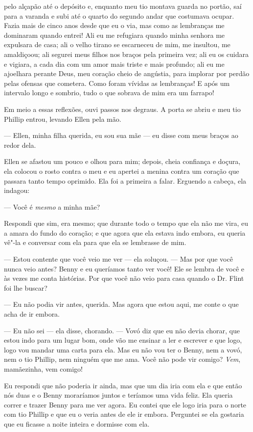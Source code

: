 pelo alçapão até o depósito e, enquanto meu tio montava guarda no
portão, saí para a varanda e subi até o quarto do segundo andar que
costumava ocupar. Fazia mais de cinco anos desde que eu o via, mas como
as lembranças me dominaram quando entrei! Ali eu me refugiara quando
minha senhora me expulsara de casa; ali o velho tirano se escarneceu de
mim, me insultou, me amaldiçoou; ali segurei meus filhos nos braços pela
primeira vez; ali eu os cuidara e vigiara, a cada dia com um amor mais
triste e mais profundo; ali eu me ajoelhara perante Deus, meu coração
cheio de angústia, para implorar por perdão pelas ofensas que cometera.
Como foram vívidas as lembranças! E após um intervalo longo e sombrio,
tudo o que sobrava de mim era um farrapo!

Em meio a essas reflexões, ouvi passos
nos degraus. A porta se abriu e meu tio Phillip entrou, levando Ellen
pela mão.

--- Ellen, minha filha querida, eu sou sua mãe --- eu disse com meus
braços ao redor dela.

Ellen se afastou um pouco e olhou para mim; depois, cheia confiança e
doçura, ela colocou o rosto contra o meu e eu apertei a menina contra um
coração que passara tanto tempo oprimido. Ela foi a primeira a falar.
Erguendo a cabeça, ela indagou:

--- Você é \emph{mesmo} a minha mãe?

Respondi que sim, era mesmo; que durante todo o tempo que ela não me
vira, eu a amara do fundo do coração; e que agora que ela estava indo
embora, eu queria vê"-la e conversar com ela para que ela se lembrasse de
mim.

--- Estou contente que você veio me ver --- ela soluçou. --- Mas por que
você nunca veio antes? Benny e eu queríamos tanto ver você! Ele se
lembra de você e às vezes me conta histórias. Por que você não veio para
casa quando o Dr. Flint foi lhe buscar?

--- Eu não podia vir antes, querida.
Mas agora que estou aqui, me conte o que acha de ir embora.

--- Eu não sei --- ela disse, chorando. --- Vovó diz que eu não devia
chorar, que estou indo para um lugar bom, onde vão me ensinar a ler e
escrever e que logo, logo vou mandar uma carta para ela. Mas eu não vou
ter o Benny, nem a vovó, nem o tio Phillip, nem ninguém que me ama. Você
não pode vir comigo? \emph{Vem}, mamãezinha, vem comigo!

Eu respondi que não poderia ir ainda,
mas que um dia iria com ela e que então nós duas e o Benny moraríamos
juntos e teríamos uma vida feliz. Ela queria correr e trazer Benny para
me ver agora. Eu contei que ele logo iria para o norte com tio Phillip e
que eu o veria antes de ele ir embora. Perguntei se ela gostaria que eu
ficasse a noite inteira e dormisse com ela.

